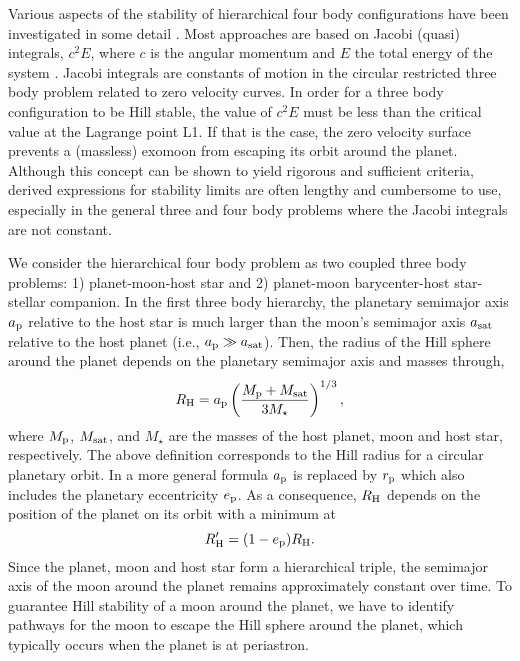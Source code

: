 \documentclass[preprint]{aastex63}
\begin{document}
Various aspects of the stability of hierarchical four body configurations have been investigated in some detail \citep[e.g.][and references therein.]{milani1983stability,liu2019stability}. Most approaches are based on Jacobi (quasi) integrals, $c^2 E$, where $c$ is the angular momentum and $E$ the total energy of the system \citep[i.e.,][]{Marchal1982}. Jacobi integrals are constants of motion in the circular restricted three body problem related to zero velocity curves. In order for a three body configuration to be Hill stable, the value of $c^2 E$ must be less
than the critical value at the Lagrange point L1. If that is the case, the zero velocity surface prevents a (massless) exomoon from escaping its orbit around the planet. 
Although this concept can be shown to yield rigorous and sufficient criteria, derived expressions for stability limits are often lengthy and cumbersome to use, especially in the general three and four body problems where the Jacobi integrals are not constant.

We consider the hierarchical four body problem as two coupled three body problems: 1) planet-moon-host star and 2) planet-moon barycenter-host star-stellar companion.  In the first three body hierarchy, the planetary semimajor axis $a_{\rm p}$ relative to the host star is much larger than the moon's semimajor axis $a_{\rm sat}$ relative to the host planet (i.e., $a_{\rm p} \gg a_{\rm sat}$). Then, the radius of the Hill sphere around the planet depends on the planetary semimajor axis and masses through,
\begin{equation}
    R_{\rm H} = a_{\rm p} \left(\frac{M_{\rm p}+M_{\rm sat}}{3M_{\star}}\right)^{1/3},
	\label{eq:rH}
\end{equation}
where $M_{\rm p}$, $M_{\rm sat}$, and $M_{\star}$ are the masses of the host planet, moon and host star, respectively.  The above definition corresponds to the Hill radius for a circular planetary orbit. In a more general formula $a_{\rm p}$ is replaced by $r_{\rm p}$ which also includes the planetary eccentricity $e_{\rm p}$. As a consequence, $R_{\rm H}$ depends on the position of the planet on its orbit with a minimum at 
\begin{equation}
    R_{\rm H}^\prime = (1-e_{\rm p})R_{\rm H}.
\end{equation} Since the planet, moon and host star form a hierarchical triple, the semimajor axis of the moon around the planet remains approximately constant over time. To guarantee Hill stability of a moon around the planet, we have to identify pathways for the moon to escape the Hill sphere around the planet, which typically occurs when the planet is at periastron.
\end{document}

